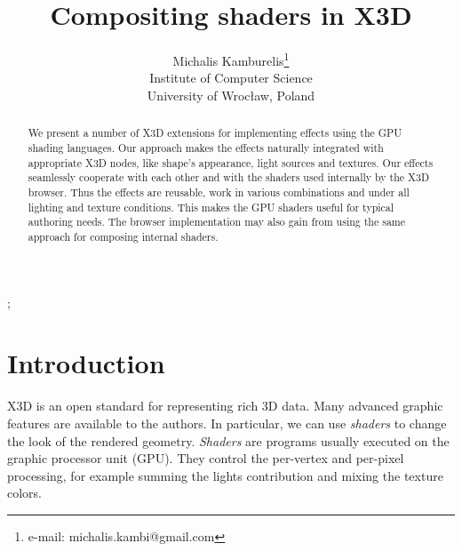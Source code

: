 \documentclass{acmsiggraph}                     %
\title{Compositing shaders in X3D}
\author{Michalis Kamburelis\thanks{e-mail: michalis.kambi@gmail.com}\\Institute of Computer Science\\University of Wroc{\l}aw, Poland}
\begin{document}

\maketitle

\begin{abstract}
We present a number of X3D extensions for implementing effects using
the GPU shading languages.
Our approach makes the effects naturally integrated with appropriate
X3D nodes, like shape's appearance, light sources and textures.
Our effects seamlessly cooperate with each other and with
the shaders used internally by the X3D browser.
Thus the effects are reusable, work in various combinations
and under all lighting and texture conditions.
This makes the GPU shaders useful for typical authoring needs.
The browser implementation may also gain from using the same approach
for composing internal shaders.
\end{abstract}

\begin{CRcatlist}
  ;
\end{CRcatlist}

\keywordlist

\section{Introduction}

\copyrightspace

X3D \cite{x3d:spec} is an open standard for representing rich 3D data.
Many advanced graphic features are available to the authors.
In particular, we can use \emph{shaders} to change the look of the rendered
geometry.
\emph{Shaders} are programs usually executed on the graphic processor unit
(GPU). They control the per-vertex and per-pixel processing,
for example summing the lights contribution
and mixing the texture colors.
\end{document}
